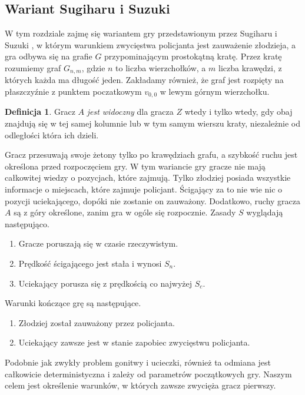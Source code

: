 \documentclass[brudnopis]{xmgr}
\theoremstyle{definition}
\newtheorem{Definicja}{Definicja}
\begin{document}
\subsection{Wariant Sugiharu i Suzuki}
W tym rozdziale zajmę się wariantem gry przedstawionym przez Sugiharu i Suzuki \cite{sugiharu}, w którym warunkiem zwycięstwa policjanta jest zauważenie złodzieja, a gra odbywa się na grafie $G$ przypominającym prostokątną kratę.
Przez kratę rozumiemy graf $G_{n,m}$, gdzie $n$ to liczba wierzchołków, a $m$ liczba krawędzi, z których każda ma długość jeden. Zakładamy również, że graf jest rozpięty na płaszczyźnie z punktem poczatkowym $v_{0,0}$ w lewym górnym wierzchołku.
\begin{Definicja}
  Gracz $A$ \emph{jest widoczny} dla gracza $Z$ wtedy i tylko wtedy, gdy obaj znajdują się w tej samej kolumnie lub w tym samym wierszu kraty, niezależnie od odległości która ich dzieli.
\end{Definicja}

Gracz przesuwają swoje żetony tylko po krawędziach grafu, a szybkość ruchu jest określona przed rozpoczęciem gry.
W tym wariancie gry gracze nie mają całkowitej wiedzy o pozycjach, które zajmują. Tylko złodziej posiada wszystkie informacje o miejscach, które zajmuje policjant. Ścigający za to nie wie nic o pozycji uciekającego, dopóki nie zostanie on zauważony. Dodatkowo, ruchy gracza $A$ są z góry określone, zanim gra w ogóle się rozpocznie.
Zasady $S$ wyglądają następująco.
\begin{enumerate}
  \item Gracze poruszają się w czasie rzeczywistym.
  \item Prędkość ścigającego jest stała i wynosi $S_n$.
  \item Uciekający porusza się z prędkością co najwyżej $S_c$.
\end{enumerate}

Warunki kończące grę są następujące.
\begin{enumerate}
  \item Złodziej został zauważony przez policjanta.
  \item Uciekający zawsze jest w stanie zapobiec zwycięstwu policjanta.
\end{enumerate}

Podobnie jak zwykły problem gonitwy i ucieczki, również ta odmiana jest całkowicie deterministyczna i zależy od parametrów początkowych gry. Naszym celem jest określenie warunków, w których zawsze zwycięża gracz pierwszy. 
\end{document}
